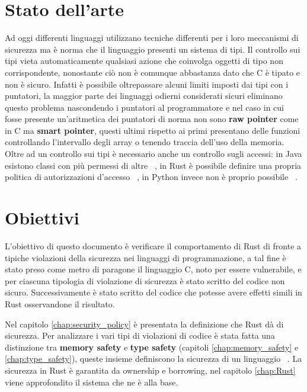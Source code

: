 \documentclass[Lau,binding=0.6cm]{sapthesis}
\begin{document}
\section {Stato dell'arte}
Ad oggi differenti linguaggi utilizzano tecniche differenti per i loro meccanismi di sicurezza ma è norma che il linguaggio presenti un sistema di tipi.
Il controllo sui tipi vieta automaticamente qualsiasi azione che coinvolga oggetti di tipo non corrispondente, nonostante ciò non è comunque abbastanza dato che C è tipato e non è sicuro.
Infatti è possibile oltrepassare alcuni limiti imposti dai tipi con i puntatori, la maggior parte dei linguaggi odierni considerati sicuri eliminano questo problema nascondendo i puntatori al programmatore e nel caso in cui fosse presente un'aritmetica dei puntatori di norma non sono \textbf{raw pointer} come in C ma \textbf{smart pointer}, questi ultimi rispetto ai primi presentano delle funzioni controllando l'intervallo degli array o tenendo traccia dell'uso della memoria.
Oltre ad un controllo sui tipi è necessario anche un controllo sugli accessi: in Java esistono classi con più permessi di altre ~\cite{java:privilege}, in Rust è possibile definire una propria politica di autorizzazioni d'accesso ~\cite{rust:auth}, in Python invece non è proprio possibile ~\cite{python:privilege}.

\section{Obiettivi}
L'obiettivo di questo documento è verificare il comportamento di Rust di fronte a tipiche violazioni della sicurezza nei linguaggi di programmazione, a tal fine è stato preso come metro di paragone il linguaggio C, noto per essere vulnerabile, e per ciascuna tipologia di violazione di sicurezza è stato scritto del codice non sicuro.
Successivamente è stato scritto del codice che potesse avere effetti simili in Rust osservandone il risultato.

Nel capitolo \ref{chap:security_policy} è presentata la definizione che Rust dà di sicurezza. 
Per analizzare i vari tipi di violazioni di codice è stata fatta una distinzione tra \textbf{memory safety} e \textbf{type safety} (capitoli \ref{chap:memory_safety} e \ref{chap:type_safety}), queste insieme definiscono la sicurezza di un linguaggio ~\cite{nino:security_programming_language}.
La sicurezza in Rust è garantita da ownership e borrowing, nel capitolo \ref{chap:Rust} viene approfondito il sistema che ne è alla base.
\end{document}
